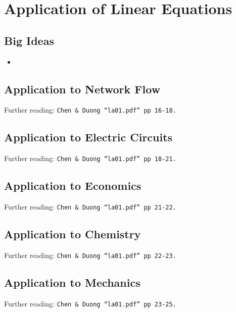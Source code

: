 \chapter{Application of Linear Equations}
\label{chap:ALE}

\section{Big Ideas}
\label{sec:ALE Big Ideas}
\begin{itemize}
  \item 
\end{itemize}

\section{Application to Network Flow}
\label{sec:ALE Network Flow}
Further reading: \texttt{Chen \& Duong ``la01.pdf'' pp 16-18.}

\section{Application to Electric Circuits}
\label{sec:ALE Electric Circuits}
Further reading: \texttt{Chen \& Duong ``la01.pdf'' pp 18-21.}

\section{Application to Economics}
\label{sec:ALE Economics}
Further reading: \texttt{Chen \& Duong ``la01.pdf'' pp 21-22.}

\section{Application to Chemistry}
\label{sec:ALE Chemistry}
Further reading: \texttt{Chen \& Duong ``la01.pdf'' pp 22-23.}

\section{Application to Mechanics}
\label{sec:ALE Mechanics}
Further reading: \texttt{Chen \& Duong ``la01.pdf'' pp 23-25.}